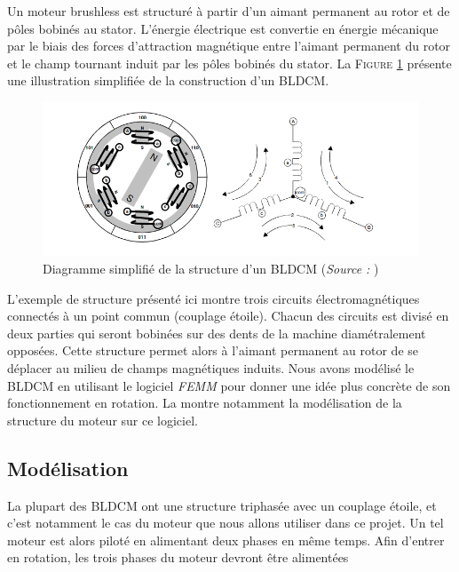 \documentclass[a4paper,12pt]{book}
\begin{document}
				
				 Un moteur brushless est structuré à partir d'un aimant permanent au rotor et de pôles bobinés au stator. L'énergie électrique est convertie en énergie mécanique par le biais des forces d'attraction magnétique entre l'aimant permanent du rotor et le champ tournant induit par les pôles bobinés du stator. La \textsc{Figure \ref{struct_bldcm}} présente une illustration simplifiée de la construction d'un BLDCM. 
				 
				 \begin{figure}
				 	\begin{center}
				 		\includegraphics[scale=0.7]{../Illus/struct_bldcm.png}
				 	\end{center}
				 	\caption{Diagramme simplifié de la structure d'un BLDCM (\textit{Source :} \cite{AN857})}
				 	\label{struct_bldcm}
				 \end{figure}
				 
				 L'exemple de structure présenté ici montre trois circuits électromagnétiques connectés à un point commun (couplage étoile). Chacun des circuits est divisé en deux parties qui seront bobinées sur des dents de la machine diamétralement opposées. Cette structure permet alors à l'aimant permanent au rotor de se déplacer au milieu de champs magnétiques induits. Nous avons modélisé le BLDCM en utilisant le logiciel \textit{FEMM} pour donner une idée plus concrète de son fonctionnement en rotation. La montre notamment la modélisation de la structure du moteur sur ce logiciel.
				 
				 \subsection{Modélisation}
				 

				 La plupart des BLDCM ont une structure triphasée avec un couplage étoile, et c'est notamment le cas du moteur que nous allons utiliser dans ce projet. Un tel moteur est alors piloté en alimentant deux phases en même temps. Afin d'entrer en rotation, les trois phases du moteur devront être alimentées 
				 
\end{document}
